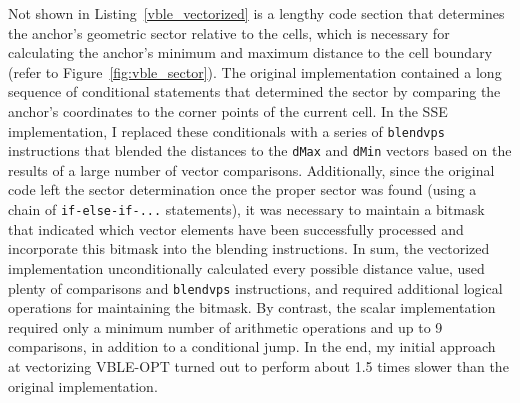 Not shown in Listing~\ref{vble_vectorized} is a lengthy code section that determines the anchor's geometric sector relative to the cells, which is necessary for calculating the anchor's minimum and maximum distance to the cell boundary (refer to Figure~\ref{fig:vble_sector}). The original implementation contained a long sequence of conditional statements that determined the sector by comparing the anchor's coordinates to the corner points of the current cell. In the SSE implementation, I replaced these conditionals with a series of \texttt{blendvps} instructions that blended the distances to the \texttt{dMax} and \texttt{dMin} vectors based on the results of a large number of vector comparisons. Additionally, since the original code left the sector determination once the proper sector was found (using a chain of \texttt{if-else-if-...} statements), it was necessary to maintain a bitmask that indicated which vector elements have been successfully processed and incorporate this bitmask into the blending instructions. In sum, the vectorized implementation unconditionally calculated every possible distance value, used plenty of comparisons and \texttt{blendvps} instructions, and required additional logical operations for maintaining the bitmask. By contrast, the scalar implementation required only a minimum number of arithmetic operations and up to 9 comparisons, in addition to a conditional jump. In the end, my initial approach at vectorizing VBLE-OPT turned out to perform about 1.5 times slower than the original implementation.

